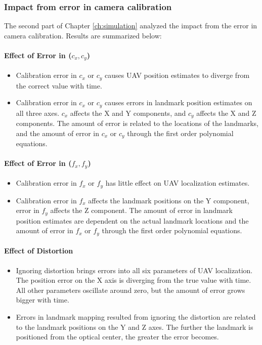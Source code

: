 \subsubsection{Impact from error in camera calibration} 
The second part of Chapter \ref{ch:simulation} analyzed the impact from the
error in camera calibration. Results are summarized below:

\paragraph{Effect of Error in ($c_x, c_y$)}
\begin{itemize}
  \item Calibration error in $c_x$ or $c_y$ causes UAV position estimates to diverge from the correct value with time.
  \item Calibration error in $c_x$ or $c_y$ causes errors in landmark
  position estimates on all three axes. $c_x$ affects the X and Y
  components, and $c_y$ affects the X and Z components. The amount of
  error is related to the locations of the landmarks, and the amount
  of error in $c_x$ or $c_y$ through the first order polynomial equations.
\end{itemize}

\paragraph{Effect of Error in ($f_x, f_y$)}
\begin{itemize}
  \item Calibration error in $f_x$ or $f_y$ has little effect on UAV
  localization estimates.
  \item Calibration error in $f_x$ affects the landmark positions on the
  Y component, error in $f_y$ affects the Z component. The amount of
  error in landmark position estimates are dependent on the actual
  landmark locations and the amount of error in $f_x$
  or $f_y$ through the first order polynomial equations.
\end{itemize}

\paragraph{Effect of Distortion}
\begin{itemize}
  \item Ignoring distortion brings errors into all six parameters of
  UAV localization. The position error on the X axis is diverging
  from the true value with time. All other parameters oscillate around
  zero, but the amount of error grows bigger with time.
  \item Errors in landmark mapping resulted from ignoring the
  distortion are related to the landmark positions on the Y and Z
  axes. The further the landmark is positioned from the optical
  center, the greater the error becomes.
\end{itemize}

